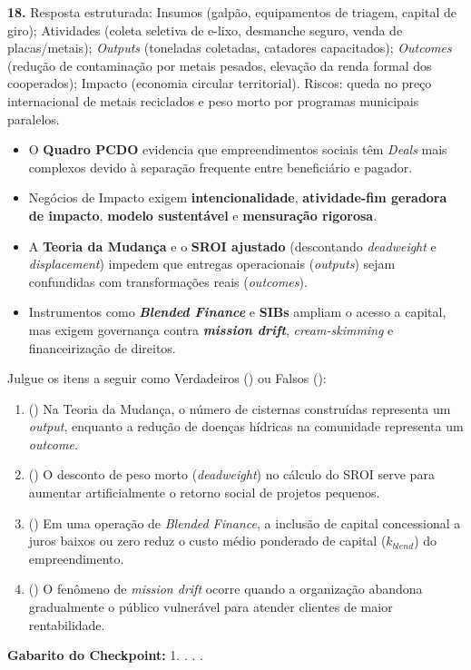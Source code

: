 \begin{boxGabarito}
\textbf{18.} Resposta estruturada: Insumos (galpão, equipamentos de triagem, capital de giro); Atividades (coleta seletiva de e-lixo, desmanche seguro, venda de placas/metais); \textit{Outputs} (toneladas coletadas, catadores capacitados); \textit{Outcomes} (redução de contaminação por metais pesados, elevação da renda formal dos cooperados); Impacto (economia circular territorial). Riscos: queda no preço internacional de metais reciclados e peso morto por programas municipais paralelos.
\end{boxGabarito}

\begin{boxResumo}
\begin{itemize}[leftmargin=1.4em, itemsep=3pt]
  \item O \textbf{Quadro PCDO} evidencia que empreendimentos sociais têm \textit{Deals} mais complexos devido à separação frequente entre beneficiário e pagador.
  \item Negócios de Impacto exigem \textbf{intencionalidade}, \textbf{atividade-fim geradora de impacto}, \textbf{modelo sustentável} e \textbf{mensuração rigorosa}.
  \item A \textbf{Teoria da Mudança} e o \textbf{SROI ajustado} (descontando \textit{deadweight} e \textit{displacement}) impedem que entregas operacionais (\textit{outputs}) sejam confundidas com transformações reais (\textit{outcomes}).
  \item Instrumentos como \textbf{\textit{Blended Finance}} e \textbf{SIBs} ampliam o acesso a capital, mas exigem governança contra \textbf{\textit{mission drift}}, \textit{cream-skimming} e financeirização de direitos.
\end{itemize}
\end{boxResumo}

\begin{boxTeste}
Julgue os itens a seguir como Verdadeiros (\V) ou Falsos (\F):
\begin{enumerate}[leftmargin=1.6em, itemsep=3pt]
  \item (\quad) Na Teoria da Mudança, o número de cisternas construídas representa um \textit{output}, enquanto a redução de doenças hídricas na comunidade representa um \textit{outcome}.
  \item (\quad) O desconto de peso morto (\textit{deadweight}) no cálculo do SROI serve para aumentar artificialmente o retorno social de projetos pequenos.
  \item (\quad) Em uma operação de \textit{Blended Finance}, a inclusão de capital concessional a juros baixos ou zero reduz o custo médio ponderado de capital ($k_{blend}$) do empreendimento.
  \item (\quad) O fenômeno de \textit{mission drift} ocorre quando a organização abandona gradualmente o público vulnerável para atender clientes de maior rentabilidade.
\end{enumerate}
\textbf{Gabarito do Checkpoint:} 1. \V {}. \F {} . \V {}. \V
\end{boxTeste}
